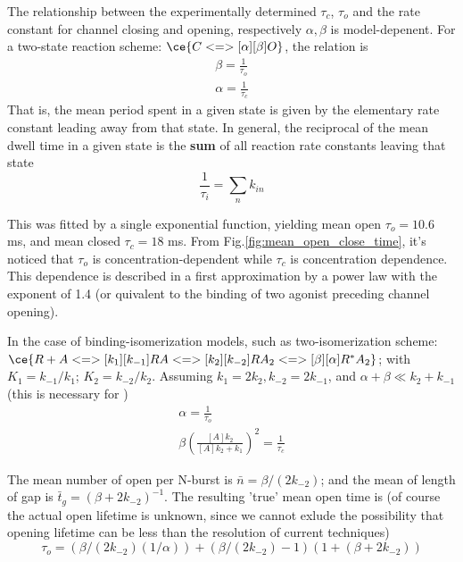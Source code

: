 The relationship between the experimentally determined $\tau_c$, $\tau_o$ and
the rate constant for channel closing and opening, respectively $\alpha, \beta$
is model-depenent. For a two-state reaction scheme: $\ce{C
<=>[\alpha][\beta]O}$, the relation is
\begin{equation}
\begin{split}
\beta = \frac{1}{\tau_o} \\
\alpha = \frac{1}{\tau_c}
\end{split}
\end{equation}
That is, the mean period spent in a given state is given by the elementary rate
constant leading away from that state. In general, the reciprocal of the mean
dwell time in a given state is the {\bf sum} of all reaction rate constants
leaving that state
\begin{equation}
\frac{1}{\tau_i} = \sum_n k_{in}
\end{equation}

This was fitted by a single exponential function, yielding mean open
$\tau_o=10.6$ ms, and mean closed $\tau_c=18$ ms.
From Fig.\ref{fig:mean_open_close_time}, it's noticed that $\tau_o$ is
concentration-dependent while $\tau_c$ is concentration dependence.
This dependence is described in a first approximation by a power law with the
exponent of 1.4 (or quivalent to the binding of two agonist preceding channel
opening).

In the case of binding-isomerization models, such as two-isomerization scheme:
$\ce{R+A <=>[k_1][k_{-1}] RA <=>[k_2][k_{-2}] RA_2 <=>[\beta][\alpha] R^*A_2}$;
with $K_1=k_{-1}/k_1$; $K_2=k_{-2}/k_2$. Assuming $k_1=2k_2,
k_{-2}=2k_{-1}$, and $\alpha+\beta \ll k_2+k_{-1}$ (this is necessary for )
\begin{equation}
\begin{split}
\alpha = \frac{1}{\tau_o} \\
\beta \left( \frac{[A]k_2}{[A]k_2+k_1} \right)^2 = \frac{1}{\tau_c}
\end{split}
\end{equation}

The mean number of open per N-burst is $\bar{n} = \beta/(2k_{-2})$; and the mean
of length of gap is $\bar{t}_g = (\beta+2k_{-2})^{-1}$. The resulting 'true'
mean open time is (of course the actual open lifetime is unknown, since we
cannot exlude the possibility that opening lifetime can be less than the
resolution of current techniques)
\begin{equation}
\tau_o = \left( \beta/(2k_{-2})(1/\alpha) \right) + \left( \beta/(2k_{-2})-1
\right) \left( 1+(\beta+2k_{-2}) \right)
\end{equation}


